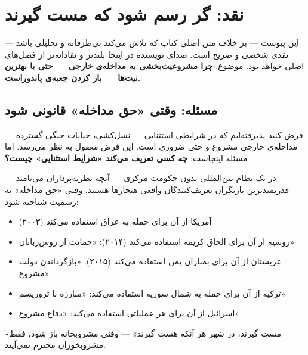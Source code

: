 \chapter{نقد: گر رسم شود که مست گیرند}
\label{ch:critical-essay}

\begin{tcolorbox}[mybox, title={درباره‌ی این پیوست}]
این پیوست — بر خلاف متن اصلی کتاب که تلاش می‌کند بی‌طرفانه و تحلیلی باشد — نقدی شخصی و صریح است. صدای نویسنده در اینجا بلندتر و نقادانه‌تر از فصل‌های اصلی خواهد بود. موضوع: \textbf{چرا مشروعیت‌بخشی به مداخله‌ی خارجی — حتی با بهترین نیت‌ها — باز کردن جعبه‌ی پاندوراست.}
\end{tcolorbox}

\section{مسئله: وقتی «حق مداخله» قانونی شود}
\label{sec:app-b-problem}

فرض کنید پذیرفته‌ایم که در شرایطی استثنایی — نسل‌کشی، جنایات جنگی گسترده — مداخله‌ی خارجی مشروع و حتی ضروری است. این فرض معقول به نظر می‌رسد. اما مسئله اینجاست: \textbf{چه کسی تعریف می‌کند «شرایط استثنایی» چیست؟}

در یک نظام بین‌المللی بدون حکومت مرکزی — آنچه نظریه‌پردازان  می‌نامند — قدرتمندترین بازیگران تعریف‌کنندگان واقعی هنجارها هستند. وقتی «حق مداخله» به رسمیت شناخته شود:

\begin{itemize}
\item آمریکا از آن برای حمله به عراق استفاده می‌کند (۲۰۰۳)
\item روسیه از آن برای الحاق کریمه استفاده می‌کند (۲۰۱۴): «حمایت از روس‌زبانان»
\item عربستان از آن برای بمباران یمن استفاده می‌کند (۲۰۱۵): «بازگرداندن دولت مشروع»
\item ترکیه از آن برای حمله به شمال سوریه استفاده می‌کند: «مبارزه با تروریسم»
\item اسرائیل از آن برای هر عملیاتی استفاده می‌کند: «دفاع مشروع»
\end{itemize}

«مست گیرند، در شهر هر آنکه هست گیرند» — وقتی مشروبخانه باز شود، فقط مشروبخوران محترم نمی‌آیند.

